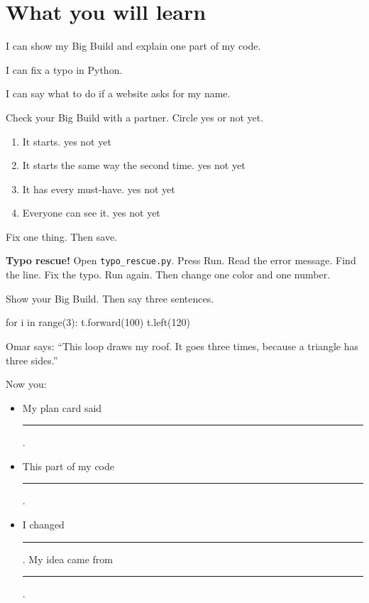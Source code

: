 
\section{What you will learn}
\begin{ican}
  \item I can show my Big Build and explain one part of my code.
  \item I can fix a typo in Python.
  \item I can say what to do if a website asks for my name.
\end{ican}

\begin{exercise}
Check your Big Build with a partner. Circle yes or not yet.
\begin{enumerate}[leftmargin=1.4em,itemsep=2pt]
  \item It starts. \hfill yes \quad not yet
  \item It starts the same way the second time. \hfill yes \quad not yet
  \item It has every must-have. \hfill yes \quad not yet
  \item Everyone can see it. \hfill yes \quad not yet
\end{enumerate}
Fix one thing. Then save.

\textbf{Typo rescue!} Open \texttt{typo\_rescue.py}. Press Run. Read the error message. Find the line. Fix the typo. Run again. Then change one color and one number.
\end{exercise}

\begin{exercise}[My Showcase]
Show your Big Build. Then say three sentences.

\noindent\begin{minipage}{\linewidth}
\begin{pycode}
for i in range(3):
    t.forward(100)
    t.left(120)
\end{pycode}
\end{minipage}
Omar says: \enquote{This loop draws my roof. It goes three times, because a triangle has three sides.}

Now you:
\begin{itemize}[leftmargin=1.4em,itemsep=2pt]
  \item My plan card said \rule{6cm}{0.4pt}.
  \item This part of my code \rule{5.5cm}{0.4pt}.
  \item I changed \rule{4cm}{0.4pt}. My idea came from \rule{3cm}{0.4pt}.
\end{itemize}
\end{exercise}

